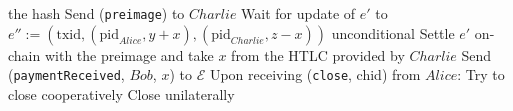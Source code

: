 \begin{algorithmic}[1]
      the hash
      \State Send (\texttt{preimage}) to $Charlie$
      \State Wait for update of $e'$ to $e'' := \left(\mathrm{txid},
      \left(\mathrm{pid}_{Alice}, y + x\right), \left(\mathrm{pid}_{Charlie}, z
      - x\right)\right)$ unconditional
        \State Settle $e'$ on-chain with the preimage and take $x$ from the HTLC
        provided by $Charlie$
      \EndIf
      \State Send (\texttt{paymentReceived}, $Bob$, $x$) to $\mathcal{E}$
    \State
    \State Upon receiving (\texttt{close}, chid) from $Alice$:
        \State Try to close cooperatively 
         
          \State Close unilaterally 
        \EndIf
      \EndIf
  \end{algorithmic}
\hrulefill
